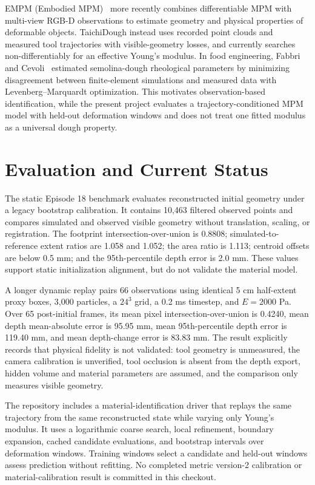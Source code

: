 \documentclass[conference]{IEEEtran}
\begin{document}
EMPM (Embodied MPM)~\cite{chen2026empm} more recently combines differentiable MPM with multi-view RGB-D observations to estimate geometry and physical properties of deformable objects. TaichiDough instead uses recorded point clouds and measured tool trajectories with visible-geometry losses, and currently searches non-differentiably for an effective Young's modulus. In food engineering, Fabbri and Cevoli~\cite{fabbri2015dough} estimated semolina-dough rheological parameters by minimizing disagreement between finite-element simulations and measured data with Levenberg--Marquardt optimization. This motivates observation-based identification, while the present project evaluates a trajectory-conditioned MPM model with held-out deformation windows and does not treat one fitted modulus as a universal dough property.

\section{Evaluation and Current Status}
The static Episode 18 benchmark evaluates reconstructed initial geometry under a legacy bootstrap calibration. It contains 10,463 filtered observed points and compares simulated and observed visible geometry without translation, scaling, or registration. The footprint intersection-over-union is 0.8808; simulated-to-reference extent ratios are 1.058 and 1.052; the area ratio is 1.113; centroid offsets are below 0.5 mm; and the 95th-percentile depth error is 2.0 mm. These values support static initialization alignment, but do not validate the material model.

A longer dynamic replay pairs 66 observations using identical 5 cm half-extent proxy boxes, 3,000 particles, a $24^3$ grid, a 0.2 ms timestep, and $E=2000$ Pa. Over 65 post-initial frames, its mean pixel intersection-over-union is 0.4240, mean depth mean-absolute error is 95.95 mm, mean 95th-percentile depth error is 119.40 mm, and mean depth-change error is 83.83 mm. The result explicitly records that physical fidelity is not validated: tool geometry is unmeasured, the camera calibration is unverified, tool occlusion is absent from the depth export, hidden volume and material parameters are assumed, and the comparison only measures visible geometry.

The repository includes a material-identification driver that replays the same trajectory from the same reconstructed state while varying only Young's modulus. It uses a logarithmic coarse search, local refinement, boundary expansion, cached candidate evaluations, and bootstrap intervals over deformation windows. Training windows select a candidate and held-out windows assess prediction without refitting. No completed metric version-2 calibration or material-calibration result is committed in this checkout.
\end{document}
